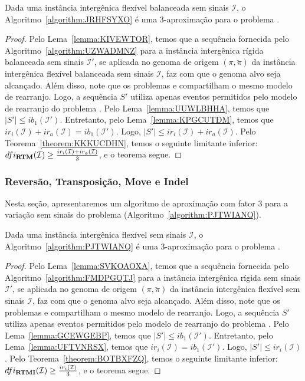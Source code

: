\begin{theorem}\label{theorem:YTAKVOTU}
Dada uma instância intergênica flexível balanceada sem sinais $\mathcal{I}$, o Algoritmo~\ref{algorithm:JRHFSYXO} é uma $3$-aproximação para o problema \SbFIRTM{}.
\end{theorem}
\begin{proof}
Pelo Lema~\ref{lemma:KIVEWTOR}, temos que a sequência fornecida pelo Algoritmo~\ref{algorithm:UZWADMNZ} para a instância intergênica rígida balanceada sem sinais $\mathcal{I'}$, se aplicada no genoma de origem $(\pi,\breve\pi)$ da instância intergênica flexível balanceada sem sinais $\mathcal{I}$, faz com que o genoma alvo seja alcançado. Além disso, note que os problemas \SbIRTM{} e \SbFIRTM{} compartilham o mesmo modelo de rearranjo. Logo, a sequência $S'$ utiliza apenas eventos permitidos pelo modelo de rearranjo do problema \SbFIRTM{}. Pelo Lema~\ref{lemma:UUWLBHHA}, temos que $|S'| \le ib_1(\mathcal{I}')$. Entretanto, pelo Lema~\ref{lemma:KPGCUTDM}, temos que $ir_i(\mathcal{I}) + ir_a(\mathcal{I}) = ib_1(\mathcal{I'})$. Logo, $|S'| \le ir_i(\mathcal{I}) + ir_a(\mathcal{I})$. Pelo Teorema~\ref{theorem:KKKUCDHN}, temos o seguinte limitante inferior: $dfi_{\textbf{RTM}}(\mathcal{I}) \ge \frac{ir_i(\mathcal{I}) + ir_a(\mathcal{I})}{3}$, e o teorema segue.
\end{proof}

\subsubsection{Reversão, Transposição, Move e Indel}

Nesta seção, apresentaremos um algoritmo de aproximação com fator $3$ para a variação sem sinais do problema \SbFIRTMI{} (Algoritmo~\ref{algorithm:PJTWIANQ}).



\begin{theorem}\label{theorem:TYVMEDAI}
Dada uma instância intergênica flexível sem sinais $\mathcal{I}$, o Algoritmo~\ref{algorithm:PJTWIANQ} é uma $3$-aproximação para o problema \SbFIRTMI{}.
\end{theorem}
\begin{proof}
Pelo Lema~\ref{lemma:SVKOAOXA}, temos que a sequência fornecida pelo Algoritmo~\ref{algorithm:FMDPGQTJ} para a instância intergênica rígida sem sinais $\mathcal{I'}$, se aplicada no genoma de origem $(\pi,\breve\pi)$ da instância intergênica flexível sem sinais $\mathcal{I}$, faz com que o genoma alvo seja alcançado. Além disso, note que os problemas \SbIRTMI{} e \SbFIRTMI{} compartilham o mesmo modelo de rearranjo. Logo, a sequência $S'$ utiliza apenas eventos permitidos pelo modelo de rearranjo do problema \SbFIRTMI{}. Pelo Lema~\ref{lemma:GCEWGEBP}, temos que $|S'| \le ib_1(\mathcal{I}')$. Entretanto, pelo Lema~\ref{lemma:UFTVNRSX}, temos que $ir_i(\mathcal{I}) = ib_1(\mathcal{I'})$. Logo, $|S'| \le ir_i(\mathcal{I})$. Pelo Teorema~\ref{theorem:BOTBXFZQ}, temos o seguinte limitante inferior: $dfi_{\textbf{RTMI}}(\mathcal{I}) \ge \frac{ir_i(\mathcal{I})}{3}$, e o teorema segue.
\end{proof}

